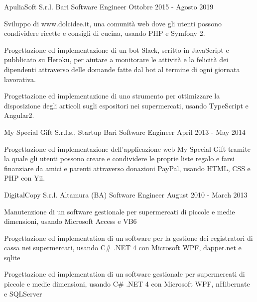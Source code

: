 \documentclass{resume} %
\begin{document}
\cvEntry
  {ApuliaSoft S.r.l.}
  {Bari}
  {Software Engineer}
  {Ottobre 2015 - Agosto 2019}{
    \begin{cvEntryItems}
      \item Sviluppo di www.dolcidee.it, una comunit\`a web dove gli utenti possono condividere
            ricette e consigli di cucina, usando PHP e Symfony 2.
      \item Progettazione ed implementazione di un bot Slack, scritto in JavaScript e pubblicato
            su Heroku, per aiutare a monitorare le attivit\`a e la felicit\`a dei dipendenti
            attraverso delle domande fatte dal bot al termine di ogni giornata lavorativa.
      \item Progettazione ed implementazione di uno strumento per ottimizzare la disposizione
            degli articoli sugli espositori nei supermercati, usando TypeScript e Angular2.
    \end{cvEntryItems}
}


\cvEntry
  {My Special Gift S.r.l.s., Startup}
  {Bari}
  {Software Engineer}
  {April 2013 - May 2014}{
    \begin{cvEntryItems}
      \item Progettazione ed implementazione dell'applicazione web My Special Gift tramite
            la quale gli utenti possono creare e condividere le proprie liste regalo e farsi
            finanziare da amici e parenti attraverso donazioni PayPal, usando HTML, CSS e
            PHP con Yii.
    \end{cvEntryItems}
}


\cvEntry
  {DigitalCopy S.r.l.}
  {Altamura (BA)}
  {Software Engineer}
  {August 2010 - March 2013}{
    \begin{cvEntryItems}
      \item Manutenzione di un software gestionale per supermercati di piccole e medie
            dimensioni, usando Microsoft Access e VB6
      \item Progettazione ed implementation di un software per la gestione dei registratori
            di cassa nei supermercati, usando C\# .NET 4 con Microsoft WPF, dapper.net e sqlite
      \item Progettazione ed implementation di un software gestionale per supermercati di
            piccole e medie dimensioni, usando C\# .NET 4 con Microsoft WPF, nHibernate e SQLServer
    \end{cvEntryItems}
}
\end{document}
